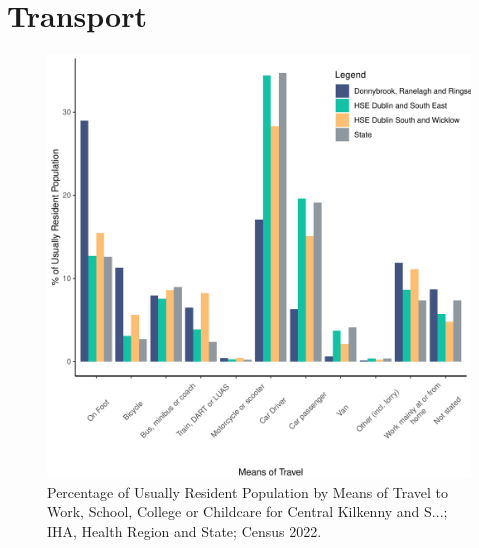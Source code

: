 \documentclass{article}
\begin{document}
\section{Transport}\label{sect:Trans}
\begin{figure}[H]
	\centering
	\includegraphics[width = 120mm]{../figures/TravelED.pdf}
	\caption{Percentage of Usually Resident Population by Means of Travel to Work, School, College or Childcare for Central Kilkenny and S...; IHA, Health Region and State; Census 2022.}
	\label{fig:vbnv}
	\end{figure}
\end{document}
